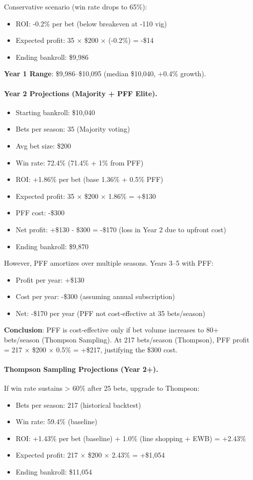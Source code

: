 Conservative scenario (win rate drops to 65\%):
\begin{itemize}
\item ROI: -0.2\% per bet (below breakeven at -110 vig)
\item Expected profit: 35 × \$200 × (-0.2\%) = -\$14
\item Ending bankroll: \$9,986
\end{itemize}

\textbf{Year 1 Range}: \$9,986--\$10,095 (median \$10,040, +0.4\% growth).

\paragraph{Year 2 Projections (Majority + PFF Elite).}
\begin{itemize}
\item Starting bankroll: \$10,040
\item Bets per season: 35 (Majority voting)
\item Avg bet size: \$200
\item Win rate: 72.4\% (71.4\% + 1\% from PFF)
\item ROI: +1.86\% per bet (base 1.36\% + 0.5\% PFF)
\item Expected profit: 35 × \$200 × 1.86\% = +\$130
\item PFF cost: -\$300
\item Net profit: +\$130 - \$300 = -\$170 (loss in Year 2 due to upfront cost)
\item Ending bankroll: \$9,870
\end{itemize}

However, PFF amortizes over multiple seasons. Years 3--5 with PFF:
\begin{itemize}
\item Profit per year: +\$130
\item Cost per year: -\$300 (assuming annual subscription)
\item Net: -\$170 per year (PFF not cost‑effective at 35 bets/season)
\end{itemize}

\textbf{Conclusion}: PFF is cost‑effective only if bet volume increases to 80+ bets/season (Thompson Sampling). At 217 bets/season (Thompson), PFF profit = 217 × \$200 × 0.5\% = +\$217, justifying the \$300 cost.

\paragraph{Thompson Sampling Projections (Year 2+).}
If win rate sustains > 60\% after 25 bets, upgrade to Thompson:
\begin{itemize}
\item Bets per season: 217 (historical backtest)
\item Win rate: 59.4\% (baseline)
\item ROI: +1.43\% per bet (baseline) + 1.0\% (line shopping + EWB) = +2.43\%
\item Expected profit: 217 × \$200 × 2.43\% = +\$1,054
\item Ending bankroll: \$11,054
\end{itemize}

